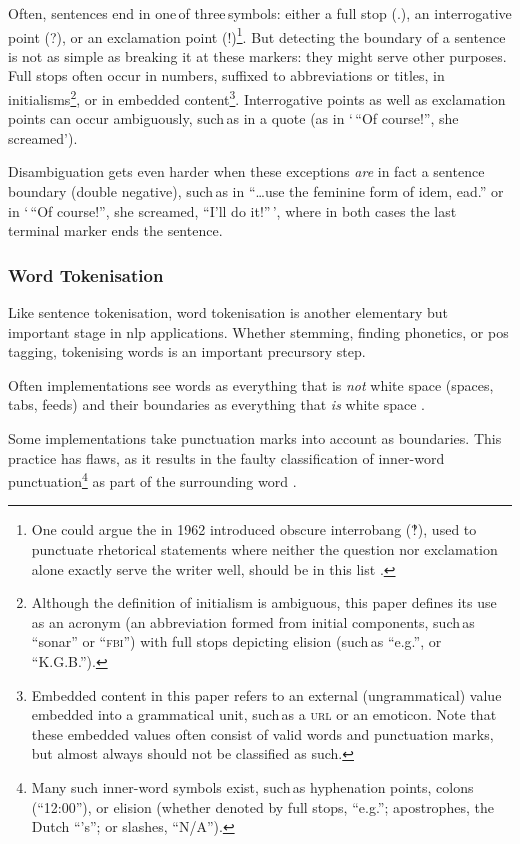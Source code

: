 Often, sentences end in one\,of three\,symbols: either a full stop (.),
  an interrogative point (?), or an exclamation point (!)\footnote{One
    could argue the in 1962 introduced
    obscure interrobang (‽), used to punctuate rhetorical statements where
    neither the question nor exclamation alone exactly serve the writer
    well, should be in this list \autocite{interrobang-mks.com}.}.
But detecting the boundary of a sentence is not as simple as breaking it at
  these markers: they might serve other purposes.
Full stops often occur in numbers, suffixed to abbreviations or titles,
  in initialisms\footnote{Although
    the definition of initialism is ambiguous, this paper defines its use
    as an acronym (an abbreviation formed from initial components, such\,as
    ``sonar'' or ``\textsc{fbi}'') with full stops depicting elision (such\,as
    ``e.g.'', or ``K.G.B.'').},
  or in embedded content\footnote{Embedded
      content in this paper refers to an external (ungrammatical) value
      embedded into a grammatical unit, such\,as a \textsc{url} or an emoticon.
    Note that these embedded values often consist of valid words and
      punctuation marks, but almost always should not be classified as such.}.
Interrogative points as well as exclamation points can occur ambiguously,
  such\,as in a quote (as in `\,``Of course!'', she screamed').

Disambiguation gets even harder when these exceptions \emph{are} in fact a
  sentence boundary (double negative), such\,as in
  ``\ldots{}use the feminine form of idem, ead.'' or in
  `\,``Of course!'', she screamed, ``I'll do it!''\,', where in both
  cases the last terminal marker ends the sentence.

\subsubsection{Word Tokenisation}\label{word-tokenisation}

Like sentence tokenisation, word tokenisation is another elementary but
important stage in \gls{nlp} applications. Whether stemming, finding
phonetics, or \gls{pos} tagging, tokenising words is an important
precursory step.

Often implementations see words as everything that is \emph{not} white
  space (spaces, tabs, feeds) and their boundaries as everything that
  \emph{is} white space \autocite{loadfive/knwl-source-code}.

Some implementations take punctuation marks into account as boundaries.
This practice has flaws, as it results in the faulty classification of
  inner-word punctuation\footnote{Many such inner-word symbols exist,
    such\,as hyphenation points, colons (``12:00''), or elision (whether
    denoted by full stops, ``e.g.''; apostrophes, the Dutch ``'s''; or
    slashes, ``N/A'').}
  as part of the surrounding word \autocite{NaturalNode/natural-source-code}.


